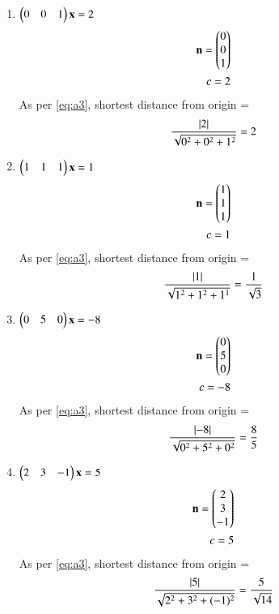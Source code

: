\documentclass[journal,12pt,twocolumn]{IEEEtran}
\begin{document}
\begin{enumerate}[label = (\alph*)]

\item $\begin{pmatrix}0&0&1\end{pmatrix}\mathbf{x} = 2 $
\begin{align}
\mathbf{n} = \begin{pmatrix}0\\0\\1\end{pmatrix}\\
c = 2
\end{align}
As per \eqref{eq:a3}, shortest distance from origin = 
\begin{align}
\frac{\left\vert2\right\vert}{\sqrt{0^2+0^2+1^2}} = 2
\end{align}

\item $\begin{pmatrix}1&1&1\end{pmatrix}\mathbf{x} = 1 $
\begin{align}
\mathbf{n} = \begin{pmatrix}1\\1\\1\end{pmatrix}\\
c = 1
\end{align}
As per \eqref{eq:a3}, shortest distance from origin = 
\begin{align}
\frac{\left\vert1\right\vert}{\sqrt{1^2+1^2+1^1}} = \frac{1}{\sqrt{3}}
\end{align}

\item $\begin{pmatrix}0&5&0\end{pmatrix}\mathbf{x} = -8 $
\begin{align}
\mathbf{n} = \begin{pmatrix}0\\5\\0\end{pmatrix}\\
c = -8
\end{align}
As per \eqref{eq:a3}, shortest distance from origin = 
\begin{align}
\frac{\left\vert-8\right\vert}{\sqrt{0^2+5^2+0^2}} = \frac{8}{5}
\end{align}

\item $\begin{pmatrix}2&3&-1\end{pmatrix}\mathbf{x} = 5 $
\begin{align}
\mathbf{n} = \begin{pmatrix}2\\3\\-1\end{pmatrix}\\
c = 5
\end{align}
As per \eqref{eq:a3}, shortest distance from origin = 
\begin{align}
\frac{\left\vert5\right\vert}{\sqrt{2^2+3^2+(-1)^2}} = \frac{5}{\sqrt{14}}
\end{align}
\end{enumerate}
\end{document}
